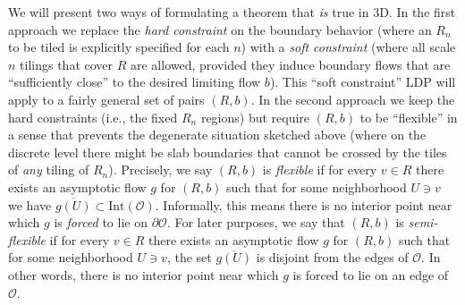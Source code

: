 \documentclass[11pt]{article}
\theoremstyle{remark}
\theoremstyle{definition}
\newcommand{\mc}[1]{\mathcal{#1}}
\begin{document}
We will present two ways of formulating a theorem that {\em is} true in 3D. In the first approach we replace the {\em hard constraint} on the boundary behavior (where an $R_n$ to be tiled is explicitly specified for each $n$) with a {\em soft constraint} (where all scale $n$ tilings that cover $R$ are allowed, provided they induce boundary flows that are ``sufficiently close'' to the desired limiting flow $b$). This ``soft constraint'' LDP will apply to a fairly general set of pairs $(R,b)$. In the second approach we keep the hard constraints (i.e., the fixed $R_n$ regions) but require $(R,b)$ to be ``flexible'' in a sense that prevents the degenerate situation sketched above (where on the discrete level there might be slab boundaries that cannot be crossed by the tiles of {\em any} tiling of $R_n$). Precisely, we say $(R,b)$ is \textit{flexible} if for every $v \in R$ there exists an asymptotic flow $g$ for $(R,b)$ such that for some neighborhood $U \ni v$ we have $\overline{g(U)} \subset \text{Int}(\mathcal O)$. Informally, this means there is no interior point near which $g$ is {\em forced} to lie on $\partial \mathcal O$.
For later purposes, we say that $(R,b)$ is \textit{semi-flexible} if for every $v \in R$ there exists an asymptotic flow $g$ for $(R,b)$ such that for some neighborhood $U \ni v$, the set $\overline{g(U)}$ is disjoint from the edges of $\mc O$. In other words, there is no interior point near which $g$ is forced to lie on an edge of $\mathcal O$.
\end{document}
